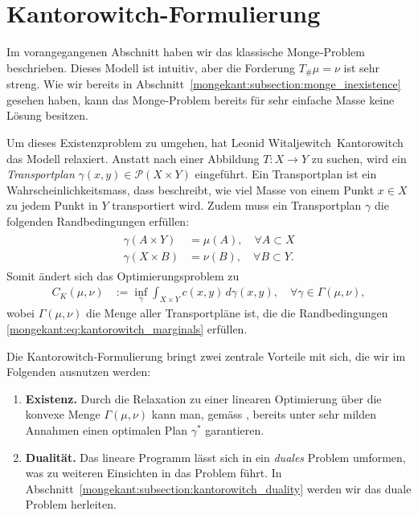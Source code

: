 %
%
%
%
\section{Kantorowitch-Formulierung%
\label{mongekant:section:teil2}}

Im vorangegangenen Abschnitt haben wir das klassische Monge‑Problem beschrieben.
Dieses Modell ist intuitiv,
aber die Forderung $T_{\#}\mu=\nu$ ist sehr streng.
Wie wir bereits in Abschnitt~\ref{mongekant:subsection:monge_inexistence} gesehen haben,
kann das Monge‑Problem bereits für sehr einfache Masse keine Lösung besitzen.

Um dieses Existenzproblem zu umgehen,
hat Leonid Witaljewitch~Kantorowitch das Modell relaxiert.
Anstatt nach einer Abbildung $T\colon X\to Y$ zu suchen,
wird ein \emph{Transportplan} $\gamma(x,y) \in \mathcal{P}(X \times Y)$ eingeführt.
Ein Transportplan ist ein Wahrscheinlichkeitsmass,
dass beschreibt,
wie viel Masse von einem Punkt $x\in X$ zu jedem Punkt in $Y$ transportiert wird.
Zudem muss ein Transportplan $\gamma$ die folgenden Randbedingungen erfüllen:
\begin{align}
\begin{aligned}
\gamma(A \times Y)
&=
\mu(A)
,\quad \forall A \subset X
\\
\gamma(X \times B)
&=
\nu(B)
,\quad \forall B \subset Y
.
\end{aligned}
\label{mongekant:eq:kantorowitch_marginals}
\end{align}
Somit ändert sich das Optimierungsproblem zu
\begin{align}
C_K(\mu, \nu)
&:=
\inf_{\gamma}
\int_{X \times Y} c(x,y)\, d\gamma(x,y)
,\quad
\forall \gamma \in \Gamma(\mu, \nu)
,
\label{mongekant:eq:kantorowitch_problem}
\end{align}
wobei $\Gamma(\mu, \nu)$ die Menge aller Transportpläne ist,
die die Randbedingungen \eqref{mongekant:eq:kantorowitch_marginals} erfüllen.

Die Kantorowitch‑Formulierung bringt zwei zentrale Vorteile mit sich,
die wir im Folgenden ausnutzen werden:
\begin{enumerate}
\item \textbf{Existenz.}
Durch die Relaxation zu einer linearen Optimierung
über die konvexe Menge $\Gamma(\mu,\nu)$ kann man,
gemäss \cite{mongekant:ethlecture},
bereits unter sehr milden Annahmen
einen optimalen Plan $\gamma^{\ast}$ garantieren.
\item \textbf{Dualität.}
Das lineare Programm lässt sich in ein \emph{duales} Problem umformen,
was zu weiteren Einsichten in das Problem führt.
In Abschnitt~\ref{mongekant:subsection:kantorowitch_duality} werden
wir das duale Problem herleiten.
\end{enumerate}

